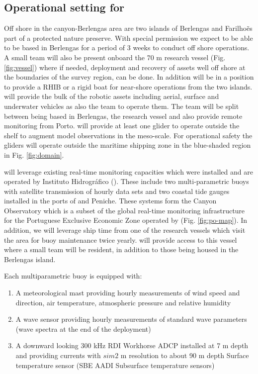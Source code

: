 \subsection{Operational setting for \proj}

Off shore in the \naz canyon-Berlengas area are two islands of
Berlengas and Farilho\~es part of a protected nature preserve. With
special permission we expect to be able to be based in Berlengas for a
period of 3 weeks to conduct off shore operations. A small team will
also be present onboard the 70 m \inst research vessel
(Fig. \ref{fig:vessel}) where if needed, deployment and recovery of
assets well off shore at the boundaries of the survey region, can be
done. In addition \inst will be in a position to provide a RHIB or a
rigid boat for near-shore operations from the two islands. \univ will
provide the bulk of the robotic assets including aerial, surface and
underwater vehicles as also the team to operate them. The team will be
split between being based in Berlengas, the research vessel and also
provide remote monitoring from Porto. \soc will provide at least one
glider to operate outside the shelf to augment model observations in
the meso-scale. For operational safety the gliders will operate
outside the maritime shipping zone in the blue-shaded region in
Fig. \ref{fig:domain}.

\proj will leverage existing real-time monitoring capacities which
were installed and are operated by Instituto Hidrogr\'{a}fico
(\inste). These include two multi-parametric buoys with satellite
transmission of hourly data sets and two coastal tide gauges installed
in the ports of \naz and Peniche. These systems form the \naz Canyon
Observatory which is a subset of the global real-time monitoring
infrastructure for the Portuguese Exclusive Economic Zone operated by
\inst (Fig. \ref{fig:po-map}). In addition, we will leverage ship time
from one of the \inst research vessels which visit the \naz area for
buoy maintenance twice yearly. \inst will provide access to this
vessel where a small \proj team will be resident, in addition to those
being housed in the Berlengas island.

Each multiparametric buoy is equipped with:

\begin{enumerate}[noitemsep,topsep=0pt,parsep=0pt,partopsep=0pt]

  \item A meteorological mast providing hourly measurements of wind speed and
    direction, air temperature, atmospheric pressure and relative
    humidity

  \item A wave sensor providing hourly measurements of standard wave parameters
    (wave spectra at the end of the deployment)

  \item A downward looking 300 kHz RDI Workhorse ADCP installed at 7 m
    depth and providing currents with $sim 2$ m resolution to about 90 m
    depth Surface temperature sensor (SBE AADI Subsurface temperature
    sensors)

\end{enumerate}  


